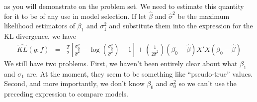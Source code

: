 \documentclass[12pt]{article}
\theoremstyle{definition}
\begin{document}
as you will demonstrate on the problem set. We need to estimate this quantity for it to be of any use in model selection. If let $\widehat{\beta}$ and $\widehat{\sigma}^2$ be the maximum likelihood estimators of $\beta_1$ and $\sigma_1^2$ and substitute them into the expression for the KL divergence, we have
\begin{eqnarray*}
\widehat{KL}(g;f) &=& \frac{T}{2}\left[\frac{\sigma_0^2}{\widehat{\sigma}^2} - \log\left(\frac{\sigma_0^2}{\widehat{\sigma}^2} \right) - 1\right] + \left(\frac{1}{2\widehat{\sigma}^2} \right)\left(\beta_0 - \widehat{\beta}\right)X'X\left(\beta_0 - \widehat{\beta}\right)
\end{eqnarray*}
We still have two problems. First, we haven't been entirely clear about what $\beta_1$ and $\sigma_1$ are. At the moment, they seem to be something like ``pseudo-true'' values. Second, and more importantly, we don't know $\beta_0$ and $\sigma_0^2$ so we can't use the preceding expression to compare models.
\end{document}
